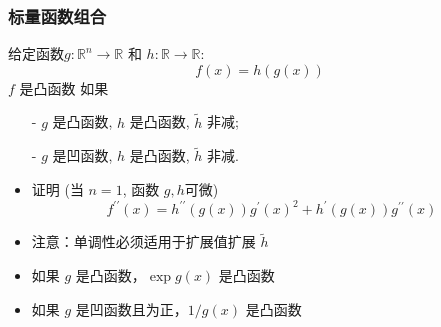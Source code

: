 \documentclass[handout,10pt]{beamer}
\begin{document}
\begin{frame}
	\frametitle{标量函数组合}
\begin{mytheorem}
	 给定函数$g: \mathbb{R}^{n} \rightarrow \mathbb{R}$ 和 $h: \mathbb{R} \rightarrow \mathbb{R}:$
	\begin{equation}
		f(x)=h(g(x))
	\end{equation}
    $f$ 是凸函数 如果
    \begin{itemize}
    	\item[-] $g$ 是凸函数, $h$ 是凸函数, $\tilde{h}$ 非减;
    	\item[-] $g$ 是凹函数, $h$ 是凸函数, $\tilde{h}$ 非减.
    \end{itemize}
\end{mytheorem}

	\begin{itemize}
		\item<2-> 证明 (当 $n=1$, 函数 $g, h$可微)
		\begin{equation}
			f^{\prime \prime}(x)=h^{\prime \prime}(g(x)) g^{\prime}(x)^{2}+h^{\prime}(g(x)) g^{\prime \prime}(x)
		\end{equation}
		\item<3-> 注意：单调性必须适用于扩展值扩展 $\tilde{h}$
	\end{itemize}
	
	\begin{itemize}
		\item<4-> 如果 $g$ 是凸函数，$\exp g(x)$ 是凸函数
		\item<5-> 如果 $g$ 是凹函数且为正，$1 / g(x)$ 是凸函数
	\end{itemize}
\end{frame}
\end{document}
